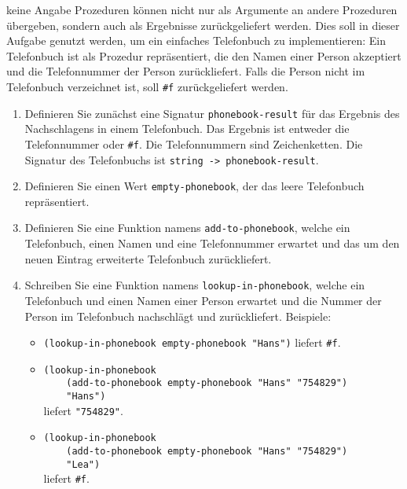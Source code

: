 \begin{aufgabe}{keine Angabe}
  Prozeduren können nicht nur als Argumente an
  andere Prozeduren übergeben, sondern auch als Ergebnisse
  zurückgeliefert werden. Dies soll in dieser Aufgabe genutzt werden,
  um ein einfaches Telefonbuch zu implementieren: Ein Telefonbuch ist
  als Prozedur repräsentiert, die den Namen einer Person akzeptiert
  und die Telefonnummer der Person zurückliefert. Falls die Person
  nicht im Telefonbuch verzeichnet ist, soll \verb|#f| zurückgeliefert
  werden.

  \begin{enumerate}
  \item Definieren Sie zunächst eine Signatur
    \verb"phonebook-result" für das Ergebnis des Nachschlagens in einem
    Telefonbuch. Das Ergebnis ist entweder die Telefonnummer oder
    \verb|#f|. Die Telefonnummern sind Zeichenketten.
    Die Signatur des Telefonbuchs ist  \verb"string -> phonebook-result".
  \item Definieren Sie einen Wert \verb"empty-phonebook", der das leere
    Telefonbuch repräsentiert.
  \item Definieren Sie eine Funktion namens
    \verb"add-to-phonebook", welche ein Telefonbuch, einen Namen
    und eine Telefonnummer erwartet und das um den neuen Eintrag
    erweiterte
    Telefonbuch zurückliefert.
  \item Schreiben Sie eine Funktion namens \verb"lookup-in-phonebook",
    welche ein Telefonbuch und einen Namen einer Person erwartet und die
    Nummer der Person im Telefonbuch nachschlägt und zurückliefert.
    Beispiele:
    \begin{itemize}
    \item \verb|(lookup-in-phonebook empty-phonebook "Hans")| liefert
      \verb|#f|.
    \item \verb|(lookup-in-phonebook| \\
      \verb|    (add-to-phonebook empty-phonebook "Hans" "754829")|\\
      \verb|    "Hans")| \\
      liefert \verb|"754829"|.
    \item \verb|(lookup-in-phonebook|\\
      \verb|    (add-to-phonebook empty-phonebook "Hans" "754829")|\\
      \verb|    "Lea")|\\
      liefert \verb|#f|.
    \end{itemize}
  \end{enumerate}
\end{aufgabe}


